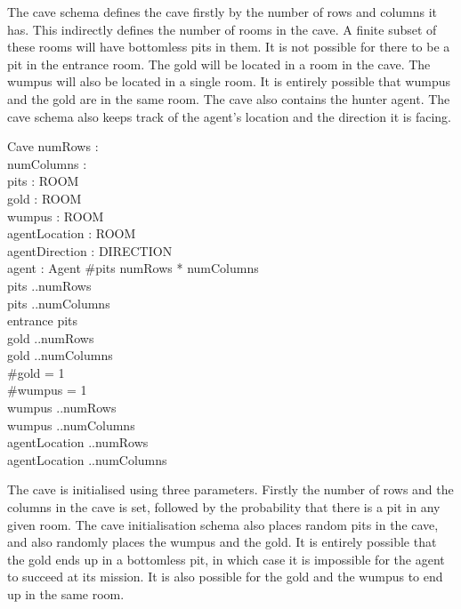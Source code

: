 \documentclass[a4paper]{article}
\begin{document}
The cave schema defines the cave firstly by the number of rows and
columns it has. This indirectly defines the number of rooms in the cave.
A finite subset of these rooms will have bottomless pits in them. 
It is not possible for there to be a pit in the entrance room.
The gold will be located in a room in the cave. The wumpus will
also be located in a single room. It is entirely possible that wumpus
and the gold are in the same room. The cave also contains the hunter
agent. The cave schema also keeps track of the agent's location and the
direction it is facing.

\begin{schema}{Cave}
	numRows : \natone \\
	numColumns : \natone \\
	pits : \fset ROOM  \\
	gold : \fsetone ROOM \\
	wumpus : \fsetone ROOM \\
	agentLocation : \fsetone ROOM \\
	agentDirection : DIRECTION \\
	agent : Agent
\where
	\#pits \leqslant numRows * numColumns \\
	\dom pits ..numRows \\
	\ran pits ..numColumns \\
	entrance \notin pits \\
	\dom gold ..numRows \\
	\ran gold ..numColumns \\
	\#gold = 1 \\
	\#wumpus = 1 \\
	\dom wumpus ..numRows \\
	\dom wumpus ..numColumns \\
	\dom agentLocation ..numRows \\
	\ran agentLocation ..numColumns \\
\end{schema}

The cave is initialised using three parameters. Firstly the number of
rows and the columns in the cave is set, followed by the probability
that there is a pit in any given room. The cave initialisation schema
also places random pits in the cave, and also randomly places the wumpus
and the gold. It is entirely possible that the gold ends up in a
bottomless pit, in which case it is impossible for the agent to succeed
at its mission. It is also possible for the gold and the wumpus to end
up in the same room.
\end{document}
